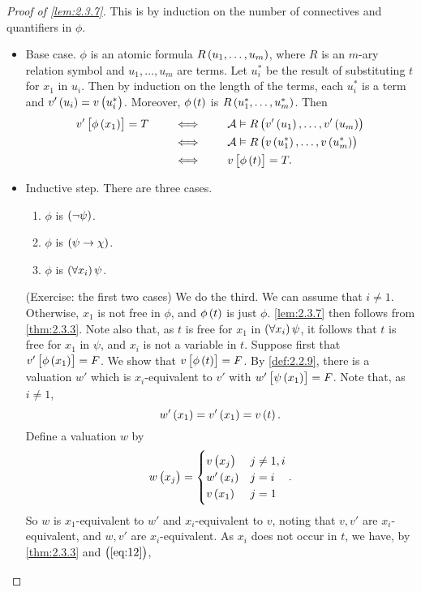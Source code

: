\begin{proof}[Proof of \ref{lem:2.3.7}]
This is by induction on the number of connectives and quantifiers in $ \phi $.
\begin{itemize}
\item Base case. $ \phi $ is an atomic formula $ R\br{u_1, \dots, u_m} $, where $ R $ is an $ m $-ary relation symbol and $ u_1, \dots, u_m $ are terms. Let $ u^*_i $ be the result of substituting $ t $ for $ x_1 $ in $ u_i $. Then by induction on the length of the terms, each $ u_i^* $ is a term and $ v'\br{u_i} = v\br{u_i^*} $. Moreover, $ \phi\br{t} $ is $ R\br{u_1^*, \dots, u_m^*} $. Then
\begin{align*}
v'\sbr{\phi\br{x_1}} = T \qquad
& \iff \qquad \AA \vDash R\br{v'\br{u_1}, \dots, v'\br{u_m}} \\
& \iff \qquad \AA \vDash R\br{v\br{u_1^*}, \dots, v\br{u_m^*}} \\
& \iff \qquad v\sbr{\phi\br{t}} = T.
\end{align*}
\item Inductive step. There are three cases.
\begin{enumerate}[leftmargin=0.5in, label=Case \arabic*.]
\item $ \phi $ is $ \notb{\psi} $.
\item $ \phi $ is $ \impb{\psi}{\chi} $.
\item $ \phi $ is $ \fab{x_i}\psi $.
\end{enumerate}
(Exercise: the first two cases) We do the third. We can assume that $ i \ne 1 $. Otherwise, $ x_1 $ is not free in $ \phi $, and $ \phi\br{t} $ is just $ \phi $. \ref{lem:2.3.7} then follows from \ref{thm:2.3.3}. Note also that, as $ t $ is free for $ x_1 $ in $ \fab{x_i}\psi $, it follows that $ t $ is free for $ x_1 $ in $ \psi $, and $ x_i $ is not a variable in $ t $. Suppose first that $ v'\sbr{\phi\br{x_1}} = F $. We show that $ v\sbr{\phi\br{t}} = F $. By \ref{def:2.2.9}, there is a valuation $ w' $ which is $ x_i $-equivalent to $ v' $ with $ w'\sbr{\psi\br{x_1}} = F $. Note that, as $ i \ne 1 $,
\begin{equation}
\label{eq:12}
w'\br{x_1} = v'\br{x_1} = v\br{t}.
\end{equation}
Define a valuation $ w $ by
$$ w\br{x_j} =
\begin{cases}
v\br{x_j} & j \ne 1, i \\
w'\br{x_i} & j = i \\
v\br{x_1} & j = 1
\end{cases}.
$$
So $ w $ is $ x_1 $-equivalent to $ w' $ and $ x_i $-equivalent to $ v $, noting that $ v, v' $ are $ x_i $-equivalent, and $ w, v' $ are $ x_i $-equivalent. As $ x_i $ does not occur in $ t $, we have, by \ref{thm:2.3.3} and $ \br{\ref{eq:12}} $,

\end{itemize}
\end{proof}
